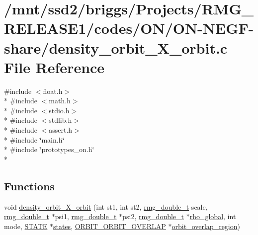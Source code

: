 \hypertarget{_o_n_2_o_n-_n_e_g_f-share_2density__orbit___x__orbit_8c}{\section{/mnt/ssd2/briggs/\-Projects/\-R\-M\-G\-\_\-\-R\-E\-L\-E\-A\-S\-E1/codes/\-O\-N/\-O\-N-\/\-N\-E\-G\-F-\/share/density\-\_\-orbit\-\_\-\-X\-\_\-orbit.c File Reference}
\label{_o_n_2_o_n-_n_e_g_f-share_2density__orbit___x__orbit_8c}
}
{\ttfamily \#include $<$float.\-h$>$}\\*
{\ttfamily \#include $<$math.\-h$>$}\\*
{\ttfamily \#include $<$stdio.\-h$>$}\\*
{\ttfamily \#include $<$stdlib.\-h$>$}\\*
{\ttfamily \#include $<$assert.\-h$>$}\\*
{\ttfamily \#include \char`\"{}main.\-h\char`\"{}}\\*
{\ttfamily \#include \char`\"{}prototypes\-\_\-on.\-h\char`\"{}}\\*
\subsection*{Functions}
\begin{DoxyCompactItemize}
\item 
void \hyperlink{_o_n_2_o_n-_n_e_g_f-share_2density__orbit___x__orbit_8c_a57910dc5e5bbb3d83f036d61ae920dd1}{density\-\_\-orbit\-\_\-\-X\-\_\-orbit} (int st1, int st2, \hyperlink{rmgtypes_8h_aaa16921c14f121c56eaa42390a340db8}{rmg\-\_\-double\-\_\-t} scale, \hyperlink{rmgtypes_8h_aaa16921c14f121c56eaa42390a340db8}{rmg\-\_\-double\-\_\-t} $\ast$psi1, \hyperlink{rmgtypes_8h_aaa16921c14f121c56eaa42390a340db8}{rmg\-\_\-double\-\_\-t} $\ast$psi2, \hyperlink{rmgtypes_8h_aaa16921c14f121c56eaa42390a340db8}{rmg\-\_\-double\-\_\-t} $\ast$\hyperlink{overlap_8h_a27883065e72831cd70385a5959eba4de}{rho\-\_\-global}, int mode, \hyperlink{struct_s_t_a_t_e}{S\-T\-A\-T\-E} $\ast$\hyperlink{md_8h_a286ebf6b996d2b1827eb9a889dfc83d7}{states}, \hyperlink{struct_o_r_b_i_t___o_r_b_i_t___o_v_e_r_l_a_p}{O\-R\-B\-I\-T\-\_\-\-O\-R\-B\-I\-T\-\_\-\-O\-V\-E\-R\-L\-A\-P} $\ast$\hyperlink{overlap_8h_a4d940a11b17ee2a495778552e85fcda3}{orbit\-\_\-overlap\-\_\-region})
\end{DoxyCompactItemize}



